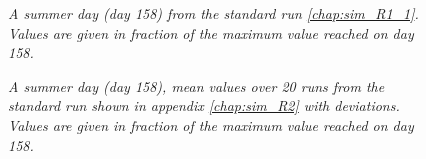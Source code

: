 		\begin{figure}[H]
			\centering
			\caption{\textit{A summer day (day 158) from the standard run \ref{chap:sim_R1_1}. Values are given in fraction of the maximum value reached on day 158.}}
			\label{fig:day158}
		\end{figure}
		
		\begin{figure}[H]
			\centering
			\caption{\textit{A summer day (day 158), mean values over 20 runs from the standard run shown in appendix \ref{chap:sim_R2} with deviations. Values are given in fraction of the maximum value reached on day 158.}}
			\label{fig:day158variation}
		\end{figure}
	
